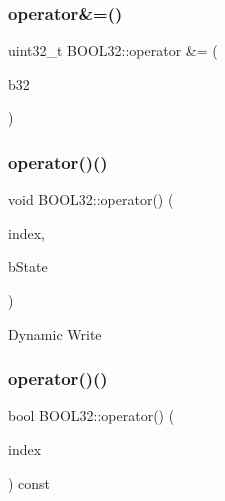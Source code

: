 \hypertarget{struct_b_o_o_l32_a0bc29e2332dc90f34582312ffb03a056}{}\label{struct_b_o_o_l32_a0bc29e2332dc90f34582312ffb03a056} 
\subsubsection{\texorpdfstring{operator\&=()}{operator\&=()}\hspace{0.1cm}{\footnotesize\ttfamily [2/2]}}
{\footnotesize\ttfamily uint32\+\_\+t B\+O\+O\+L32\+::operator \&= (\begin{DoxyParamCaption}\item[{const \hyperlink{struct_b_o_o_l32}{B\+O\+O\+L32}}]{b32 }\end{DoxyParamCaption})\hspace{0.3cm}{\ttfamily [inline]}}

\hypertarget{struct_b_o_o_l32_a3d33ecdccb02bb7e2093c5de50a5ac5e}{}\label{struct_b_o_o_l32_a3d33ecdccb02bb7e2093c5de50a5ac5e} 
\subsubsection{\texorpdfstring{operator()()}{operator()()}\hspace{0.1cm}{\footnotesize\ttfamily [1/2]}}
{\footnotesize\ttfamily void B\+O\+O\+L32\+::operator() (\begin{DoxyParamCaption}\item[{const uint8\+\_\+t}]{index,  }\item[{const bool}]{b\+State }\end{DoxyParamCaption})\hspace{0.3cm}{\ttfamily [inline]}}

Dynamic Write \hypertarget{struct_b_o_o_l32_a525b18fe28c1fad0527214591e60d2a2}{}\label{struct_b_o_o_l32_a525b18fe28c1fad0527214591e60d2a2} 
\subsubsection{\texorpdfstring{operator()()}{operator()()}\hspace{0.1cm}{\footnotesize\ttfamily [2/2]}}
{\footnotesize\ttfamily bool B\+O\+O\+L32\+::operator() (\begin{DoxyParamCaption}\item[{const uint8\+\_\+t}]{index }\end{DoxyParamCaption}) const\hspace{0.3cm}{\ttfamily [inline]}}


